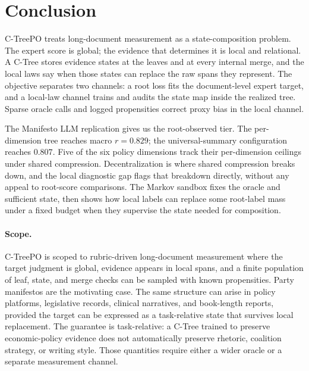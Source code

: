 \section{Conclusion}\label{sec:v8-conclusion}

C-TreePO treats long-document measurement as a state-composition
problem. The expert score is global; the evidence that determines
it is local and relational. A C-Tree stores evidence states at the
leaves and at every internal merge, and the local laws say when
those states can replace the raw spans they represent. The objective
separates two channels: a root loss fits the document-level expert
target, and a local-law channel trains and audits the state map
inside the realized tree. Sparse oracle calls and logged
propensities correct proxy bias in the local channel.

The Manifesto LLM replication gives us the root-observed tier. The
per-dimension tree reaches macro \(r=0.829\); the universal-summary
configuration reaches \(0.807\). Five of the six policy dimensions
track their per-dimension ceilings under shared compression.
Decentralization is where shared compression breaks down, and the
local diagnostic gap flags that breakdown directly, without any
appeal to root-score comparisons. The Markov sandbox fixes the
oracle and sufficient state, then shows how local labels can
replace some root-label mass under a fixed budget when they
supervise the state needed for composition.

\paragraph{Scope.}
C-TreePO is scoped to rubric-driven long-document measurement
where the target judgment is global, evidence appears in local
spans, and a finite population of leaf, state, and merge checks
can be sampled with known propensities. Party manifestos are the
motivating case. The same structure can arise in policy platforms,
legislative records, clinical narratives, and book-length reports,
provided the target can be expressed as a task-relative state that
survives local replacement. The guarantee is task-relative: a
C-Tree trained to preserve economic-policy evidence does not
automatically preserve rhetoric, coalition strategy, or writing
style. Those quantities require either a wider oracle or a separate
measurement channel.

